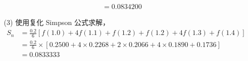 \documentclass{sjtuarticle}
\begin{document}
\begin{itemize}
\begin{solution}
\begin{itemize}
\begin{align*}
                &=0.0834200
            \end{align*}
            \item[(3)] 使用复化 Simpson 公式求解，
            \begin{align*}
                S_n&=\frac{0.2}{6}[f(1.0)+4f(1.1)+f(1.2)+f(1.2)+4f(1.3)+f(1.4)]\\
                &=\frac{0.2}{6}\times [0.2500+4\times 0.2268+2\times 0.2066+4\times 0.1890+0.1736]\\
                &=0.0833333
            \end{align*}
        \end{itemize}
    \end{solution}
\end{itemize}
\end{document}
